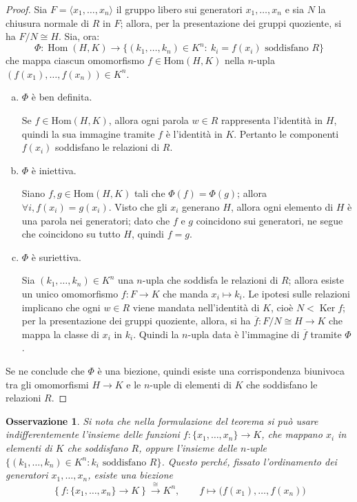 \documentclass[11pt]{article}
\theoremstyle{style}
\newtheorem{osservazione}{Osservazione}[section]
\numberwithin{equation}{subsection}
\begin{document}
	\begin{proof}
Sia \(F=\langle x_1,\dots,x_n\rangle\) il gruppo libero sui generatori \(x_1,\dots,x_n\) e sia \(N\) la chiusura normale di \(R\) in \(F\); allora, per la presentazione dei gruppi quoziente, si ha $F / N \cong H$. 
Sia, ora:
\[
\Phi:\operatorname{Hom}(H,K)\longrightarrow \{(k_1,\dots,k_n)\in K^n:\ k_i=f(x_i)\text{ soddisfano }R\}
\]
che mappa ciascun omomorfismo $f \in \mathrm{Hom} (H,K)$ nella $n$-upla \((f(x_1),\dots,f(x_n)) \in K^n\).

\begin{enumerate}[(a).]
	\item $\Phi$ \`e ben definita.

Se $f \in \mathrm{Hom} (H,K)$, allora ogni parola \(w\in R\) rappresenta l'identità in \(H\), quindi la sua immagine tramite \(f\) è l'identità in \(K\). 
Pertanto le componenti \(f(x_i)\) soddisfano le relazioni di \(R\).

\item $\Phi$ \`e iniettiva.

Siano \(f,g \in \mathrm{Hom} (H,K)\) tali che \(\Phi(f)=\Phi(g)\); allora \(\forall i, f(x_i)=g(x_i)\).
Visto che gli \(x_i\) generano \(H\), allora ogni elemento di \(H\) è una parola nei generatori; dato che \(f\) e \(g\) coincidono sui generatori, ne segue che coincidono su tutto \(H\), quindi \(f=g\).

\item $\Phi$ \`e suriettiva.

Sia \((k_1,\dots,k_n)\in K^n\) una \(n\)-upla che soddisfa le relazioni di \(R\); allora esiste un unico omomorfismo $f : F \to K$ che manda \(x_i\longmapsto k_i\).
Le ipotesi sulle relazioni implicano che ogni \(w\in R\) viene mandata nell'identità di \(K\), cioè $N < \operatorname{Ker} f$; per la presentazione dei gruppi quoziente, allora, si ha $\overline{f}:F / N \cong H \longrightarrow K$ che mappa la classe di $x_i$ in $k_i$.
Quindi la $n$-upla data è l'immagine di $\overline{f}$ tramite \(\Phi\).
\end{enumerate}
Se ne conclude che \(\Phi\) è una biezione, quindi esiste una corrispondenza biunivoca tra gli omomorfismi \(H\to K\) e le \(n\)-uple di elementi di \(K\) che soddisfano le relazioni \(R\). 
\end{proof}
\begin{osservazione}
Si nota che nella formulazione del teorema si può usare indifferentemente l'insieme delle funzioni \(f:\{x_1,\dots,x_n\}\longrightarrow K\), che mappano \(x_i\) in elementi di \(K\) che soddisfano \(R\), oppure l'insieme delle \(n\)-uple \(\{(k_1,\dots,k_n)\in K^n:k_i \text{ soddisfano } R\}\).
Questo perché, fissato l'ordinamento dei generatori \(x_1,\dots,x_n\), esiste una biezione 
\[
\left\{ f:\{x_1,\dots,x_n\}\longrightarrow  K\right\}\xrightarrow{\ \cong\ }K^n,\qquad f\longmapsto\big(f(x_1),\dots,f(x_n)\big)
\]
\end{osservazione}
\end{document}
